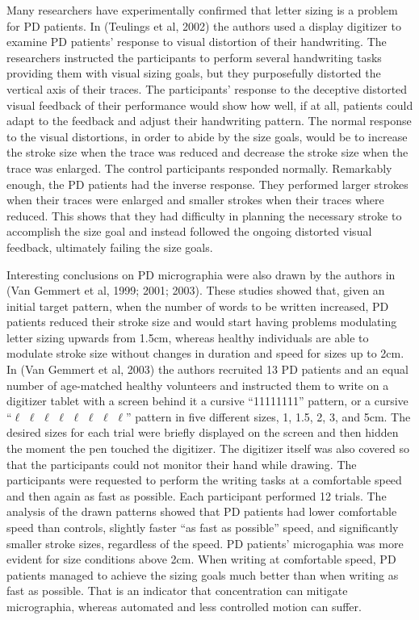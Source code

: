 Many researchers have experimentally confirmed that letter sizing is a problem for \gls{PD} patients. In (Teulings et al, 2002) the authors used a display digitizer to examine \gls{PD} patients' response to visual distortion of their handwriting. The researchers instructed the participants to perform several handwriting tasks providing them with visual sizing goals, but they purposefully distorted the vertical axis of their traces. The participants' response to the deceptive distorted visual feedback of their performance would show how well, if at all, patients could adapt to the feedback and adjust their handwriting pattern. The normal response to the visual distortions, in order to abide by the size goals, would be to increase the stroke size when the trace was reduced and decrease the stroke size when the trace was enlarged. The control participants responded normally. Remarkably enough, the \gls{PD} patients had the inverse response. They performed larger strokes when their traces were enlarged and smaller strokes when their traces where reduced. This shows that they had difficulty in planning the necessary stroke to accomplish the size goal and instead followed the ongoing distorted visual feedback, ultimately failing the size goals. 

Interesting conclusions on \gls{PD} micrographia were also drawn by the authors in (Van Gemmert et al, 1999; 2001; 2003). These studies showed that, given an initial target pattern, when the number of words to be written increased, \gls{PD} patients reduced their stroke size and would start having problems modulating letter sizing upwards from 1.5cm, whereas healthy individuals are able to modulate stroke size without changes in duration and speed for sizes up to 2cm. In (Van Gemmert et al, 2003) the authors recruited 13 \gls{PD} patients and an equal number of age-matched healthy volunteers and instructed them to write on a digitizer tablet with a screen behind it a cursive ``11111111'' pattern, or a cursive ``$\ell$ $\ell$ $\ell$ $\ell$ $\ell$ $\ell$ $\ell$ $\ell$'' pattern in five different sizes, 1, 1.5, 2, 3, and 5cm. The desired sizes for each trial were briefly displayed on the screen and then hidden the moment the pen touched the digitizer. The digitizer itself was also covered so that the participants could not monitor their hand while drawing. The participants were requested to perform the writing tasks at a comfortable speed and then again as fast as possible. Each participant performed 12 trials. The analysis of the drawn patterns showed that \gls{PD} patients had lower comfortable speed than controls, slightly faster ``as fast as possible'' speed, and significantly smaller stroke sizes, regardless of the speed. \gls{PD} patients' microgaphia was more evident for size conditions above 2cm. When writing at comfortable speed, \gls{PD} patients managed to achieve the sizing goals much better than when writing as fast as possible. That is an indicator that concentration can mitigate micrographia, whereas automated and less controlled motion can suffer. 


